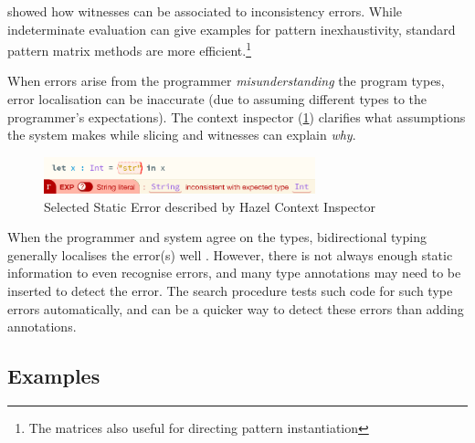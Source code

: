  showed how witnesses can be associated to inconsistency errors. While indeterminate evaluation can give examples for pattern inexhaustivity, standard pattern matrix methods \cite{PatternMatchingWarnings} are more efficient.\footnote{The matrices also useful for directing pattern instantiation}

When errors arise from the programmer \textit{misunderstanding} the program types, error localisation can be inaccurate (due to assuming different types to the programmer's expectations). The context inspector (\cref{fig:ContextInspector}) clarifies what assumptions the system makes while slicing and witnesses can explain \textit{why}.

\begin{figure}[h]\centering
\includegraphics[width=0.7\textwidth]{Media/Figures/context_inspector}
\caption{Selected Static Error described by Hazel Context Inspector}
\label{fig:ContextInspector}
\end{figure}

When the programmer and system agree on the types, bidirectional typing generally localises the error(s) well \cite{BidirectionalTypes, MarkedLocalisation}. However, there is not always enough static information to even recognise errors, and many type annotations may need to be inserted to detect the error. The search procedure tests such code for such type errors automatically, and can be a quicker way to detect these errors than adding annotations. 

\subsection{Examples}
\label{sec:EvalExamples}

